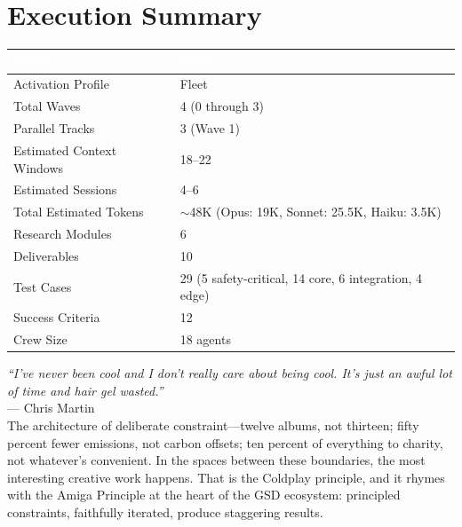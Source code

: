 \documentclass[11pt,letterpaper]{article}
\newcommand{\tableheader}[1]{\textbf{\sffamily\textcolor{white}{#1}}}
\begin{document}
\section{Execution Summary}

\begin{center}
\begin{tabularx}{\textwidth}{L{5cm}X}
\toprule
{}
\tableheader{Metric} & \tableheader{Value} \\
\midrule
Activation Profile & Fleet \\
Total Waves & 4 (0 through 3) \\
Parallel Tracks & 3 (Wave 1) \\
Estimated Context Windows & 18--22 \\
Estimated Sessions & 4--6 \\
Total Estimated Tokens & $\sim$48K (Opus: 19K, Sonnet: 25.5K, Haiku: 3.5K) \\
Research Modules & 6 \\
Deliverables & 10 \\
Test Cases & 29 (5 safety-critical, 14 core, 6 integration, 4 edge) \\
Success Criteria & 12 \\
Crew Size & 18 agents \\
\bottomrule
\end{tabularx}
\end{center}

\vspace{1em}

\begin{quotebox}
\textit{``I've never been cool and I don't really care about being cool. It's just an awful lot of time and hair gel wasted.''}\\[0.5em]
\hfill--- Chris Martin\\[1em]
The architecture of deliberate constraint---twelve albums, not thirteen; fifty percent fewer emissions, not carbon offsets; ten percent of everything to charity, not whatever's convenient. In the spaces between these boundaries, the most interesting creative work happens. That is the Coldplay principle, and it rhymes with the Amiga Principle at the heart of the GSD ecosystem: principled constraints, faithfully iterated, produce staggering results.
\end{quotebox}
\end{document}
